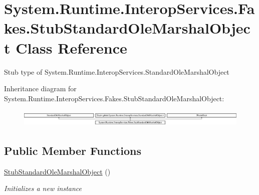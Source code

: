 \hypertarget{class_system_1_1_runtime_1_1_interop_services_1_1_fakes_1_1_stub_standard_ole_marshal_object}{\section{System.\-Runtime.\-Interop\-Services.\-Fakes.\-Stub\-Standard\-Ole\-Marshal\-Object Class Reference}
\label{class_system_1_1_runtime_1_1_interop_services_1_1_fakes_1_1_stub_standard_ole_marshal_object}
}


Stub type of System.\-Runtime.\-Interop\-Services.\-Standard\-Ole\-Marshal\-Object 


Inheritance diagram for System.\-Runtime.\-Interop\-Services.\-Fakes.\-Stub\-Standard\-Ole\-Marshal\-Object\-:\begin{figure}[H]
\begin{center}
\leavevmode
\includegraphics[height=0.831477cm]{class_system_1_1_runtime_1_1_interop_services_1_1_fakes_1_1_stub_standard_ole_marshal_object}
\end{center}
\end{figure}
\subsection*{Public Member Functions}
\begin{DoxyCompactItemize}
\item 
\hyperlink{class_system_1_1_runtime_1_1_interop_services_1_1_fakes_1_1_stub_standard_ole_marshal_object_af7c151cea6ad25a8557d5f19b7756d50}{Stub\-Standard\-Ole\-Marshal\-Object} ()
\begin{DoxyCompactList}\small\item\em Initializes a new instance\end{DoxyCompactList}\end{DoxyCompactItemize}

